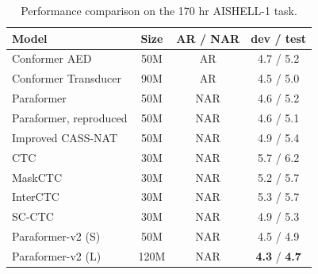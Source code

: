 \documentclass[runningheads]{llncs}
\begin{document}
\begin{table}
\caption{Performance comparison on the 170 hr AISHELL-1 task.}
\centering
\begin{tabular}{l|c|c| c}
\hline
\textbf{Model} & \textbf{Size} & \textbf{ AR / NAR } & \textbf{ dev / test } \\
\hline
Conformer AED~\cite{paraformer} & 50M & AR & 4.7 / 5.2  \\
Conformer Transducer~\cite{espnet_rnnt}& 90M & AR & 4.5 / 5.0 \\
Paraformer~\cite{paraformer} & 50M & NAR & 4.6 / 5.2 \\
Paraformer, reproduced  & 50M & NAR & 4.6 / 5.1 \\
Improved CASS-NAT~\cite{improve-cass-nat} & 50M & NAR & 4.9 / 5.4 \\
CTC~\cite{scctc} & 30M & NAR & 5.7 / 6.2  \\
MaskCTC~\cite{scctc} & 30M & NAR & 5.2 / 5.7 \\
InterCTC~\cite{scctc} & 30M & NAR & 5.3 / 5.7 \\
SC-CTC~\cite{scctc} & 30M & NAR & 4.9 / 5.3  \\
\hline
Paraformer-v2 (S) & 50M & NAR & 4.5 / 4.9 \\
Paraformer-v2 (L) & 120M & NAR & \textbf{4.3} / \textbf{4.7} \\
\hline
\end{tabular}
\label{tab1}
\vspace{-0.5cm}
\end{table}
\end{document}
